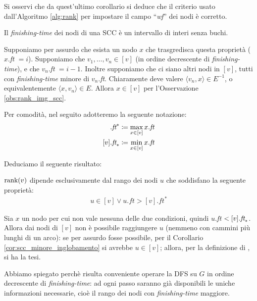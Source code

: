 Si osservi che da quest'ultimo corollario si deduce che il criterio usato dall'Algoritmo \ref{alg:rank} per impostare il campo ``\emph{wf}'' dei nodi è corretto.
\begin{corollary}
    \label{cor:no_buchi_scc}
    Il \emph{finishing-time} dei nodi di una SCC è un intervallo di interi senza buchi.
\end{corollary}
\begin{proof2}
    Supponiamo per assurdo che esista un nodo $x$ che trasgredisca questa proprietà ($x$.\emph{ft} $= i$). Supponiamo che $v_1, \dots, v_n \in [v]$ (in ordine decrescente di \emph{finishing-time}), e che $v_n$.\emph{ft} $= i-1$. Inoltre supponiamo che ci siano altri nodi in $[v]$, tutti con \emph{finishing-time} minore di $v_n$.\emph{ft}. Chiaramente deve valere $\langle v_n,x \rangle \in E^{-1}$, o equivalentemente $\langle x,v_n \rangle \in E$. Allora $x \in [v]$ per l'Osservazione \ref{obs:rank_img_scc}.
\end{proof2}

Per comodità, nel seguito adotteremo la seguente notazione:
\begin{align*}
    [v].\emph{ft}^* &\coloneqq \max_{x \in [v]} x.\emph{ft}\\
    [v].\emph{ft}_* &\coloneqq \min_{x \in [v]} x.\emph{ft}
\end{align*}

Deduciamo il seguente risultato:
\begin{proposition}
    \label{prop:rank_independent}
    $\textup{rank}(v)$ dipende esclusivamente dal rango dei nodi $u$ che soddisfano la seguente proprietà:
    \begin{gather}
        u \in [v] \lor u.ft > [v].ft^* \label{rank_independency_formula}
    \end{gather}
\end{proposition}
\begin{proof2}
    Sia $x$  un nodo per cui non vale nessuna delle due condizioni, quindi $u$.\emph{ft} $< [v].\emph{ft}_*$. Allora dai nodi di $[v]$ non è possibile raggiungere $u$ (nemmeno con cammini più lunghi di un arco): se per assurdo fosse possibile, per il Corollario \ref{cor:scc_minore_inglobamento} si avrebbe $u \in [v]$; allora, per la definizione di \rankfunc, si ha la tesi.
\end{proof2}
Abbiamo spiegato perchè risulta conveniente operare la DFS su $G$ in ordine decrescente di \emph{finishing-time}: ad ogni passo saranno già disponibili le uniche informazioni necessarie, cioè il rango dei nodi con \emph{finishing-time} maggiore.

